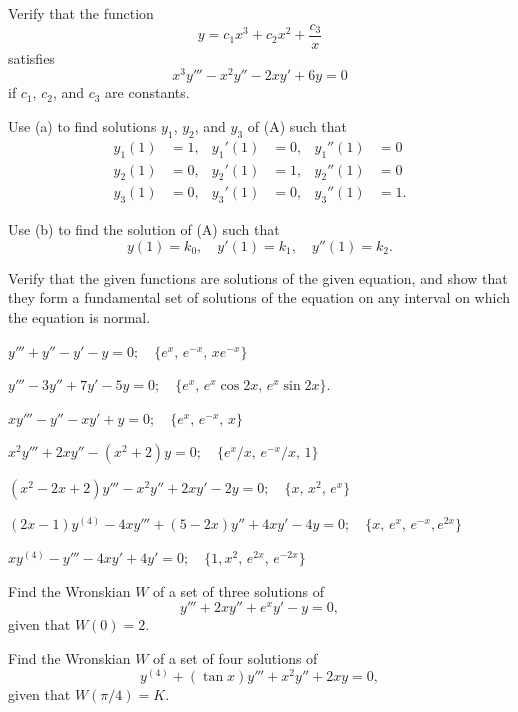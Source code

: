 \begin{exerciselist}
\item\label{exer:9.1.5}\begin{alist}
\item %
Verify that the function
\[
y=c_1x^3+c_2x^2+\frac{c_3}{x}
\]
satisfies
\[
x^3 y'''-x^2y''-2xy'+6y=0
\tag{A}
\]
if $c_1$, $c_2$, and $c_3$ are constants.

\item %
Use (a) to find solutions $y_1$, $y_2$, and $y_3$ of
(A) such that
\begin{align*}
y_1(1)&=1,& y_1'(1)&=0,&  y_1''(1)&=0  \\
y_2(1)&=0,& y_2'(1)&=1,&  y_2''(1)&=0  \\
y_3(1)&=0,& y_3'(1)&=0,&  y_3''(1)&=1.
\end{align*}

\item %
Use (b) to find the solution of  (A) such that
\[
y(1)=k_0,\quad y'(1)=k_1,\quad   y''(1)=k_2.
\]
\end{alist}

\item\label{exer:9.1.6}Verify that the given functions are solutions of the given equation, and
 show that they  form a fundamental set of solutions of the
equation on any interval on which the equation is normal.

\begin{alist}
\item $y'''+y''-y'-y=0;  \quad\{e^x,\,e^{-x},\,xe^{-x}\}$
\item $y'''-3y''+7y'-5y=0;  \quad\{e^x,\,e^x\cos2x,\,e^x\sin2x\}$.
\item $xy'''-y''-xy'+y=0;  \quad \{e^x,\,e^{-x},\,x\}$
\item $x^2y'''+2xy''-(x^2+2)y=0;  \quad\{e^x/ x,\,e^{-x}/x,\,1\}$
\item $(x^2-2x+2)y'''-x^2y''+2xy'-2y=0;  \quad \{x,\,x^2,\,e^x\}$
\item $(2x-1)y^{(4)}-4xy'''+(5-2x)y''+4xy'-4y=0;
\quad\{x,\,e^x,\,e^{-x},e^{2x}\}$
\item $xy^{(4)}-y'''-4xy'+4y'=0;  \quad\{1,x^2,\,e^{2x},\,e^{-2x}\}$
\end{alist}

\item\label{exer:9.1.7}Find the Wronskian $W$ of a set of three solutions
of \[ y'''+2xy''+e^xy'-y=0, \] given that $W(0)=2$.

\item\label{exer:9.1.8}Find the Wronskian $W$ of a set of four solutions of
\[
y^{(4)}+(\tan x)y'''+x^2y''+2xy=0,
\]
given that $W(\pi/4)=K$.


\end{exerciselist}
